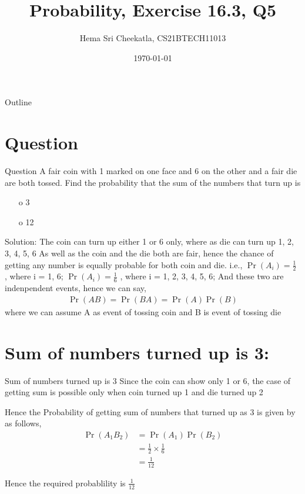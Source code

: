 \documentclass{beamer}
\title{Probability, Exercise 16.3, Q5}
\author{Hema Sri Cheekatla, CS21BTECH11013}
\date{\today}
\providecommand{\pr}[1]{\ensuremath{\Pr\left(#1\right)}}
\begin{document}
\begin{frame}
    \titlepage 
\end{frame}

\logo{}


\begin{frame}{Outline}
    \tableofcontents
\end{frame}


\section{Question}
\begin{frame}{Question}
A fair coin with 1 marked on one face and 6 on the other and a fair die are both tossed. Find the probability that the sum of the numbers that turn up is 
\begin{itemize}
    \item[o] 3
    \item[o] 12
\end{itemize}

\end{frame}

\begin{frame}{Solution:}
The coin can turn up either 1 or 6 only, where as die can turn up 1, 2, 3, 4, 5, 6\newline
As well as the coin and the die both are fair, hence the chance of getting any number is equally probable for both coin and die.\newline
i.e., \newline
$ \pr{A_i} = \frac{1}{2} $ , where i = 1, 6; \newline
$ \pr{A_i} = \frac{1}{6} $ , where i = 1, 2, 3, 4, 5, 6; \newline
And these two are indenpendent events, hence we can say,
\begin{align}
	\pr{AB} = \pr{BA} = \pr{A}\pr{B}
\end{align}
where we can assume A as event of tossing coin and B is event of tossing die \newline
\end{frame}

\section{Sum of numbers turned up is 3:}
\begin{frame}{Sum of numbers turned up is 3}
Since the coin can show only 1 or 6, the case of getting sum is possible only when coin turned up 1 and die turned up 2 \newline

Hence the Probability of getting sum of numbers that turned up as 3 is given by as follows,
\begin{align}
	\pr{A_1 B_2} &= \pr{A_1} \pr{B_2} \\
	&= \frac{1}{2} \times \frac{1}{6} \\
	&= \frac{1}{12}
\end{align}
\begin{block}{}
Hence the required probablility is $\frac{1}{12}$
\end{block}
\end{frame}
\end{document}
